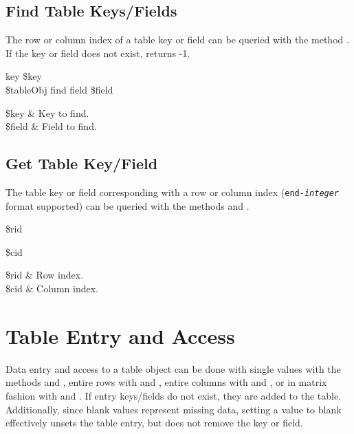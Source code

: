 \subsection{Find Table Keys/Fields}
The row or column index of a table key or field can be queried with the method . \\
If the key or field does not exist, returns -1.

\begin{syntax}
 key \$key \\
\$tableObj find field \$field
\end{syntax}
\begin{args}
\$key & Key to find. \\
\$field & Field to find.
\end{args}

\subsection{Get Table Key/Field}
The table key or field corresponding with a row or column index (\texttt{end-\textit{integer}} format supported) can be queried with the methods  and . 
\begin{syntax}
 \$rid
\end{syntax}
\begin{syntax}
 \$cid
\end{syntax}
\begin{args}
\$rid & Row index. \\
\$cid & Column index.
\end{args}
\clearpage

\section{Table Entry and Access}
Data entry and access to a table object can be done with single values with the methods  and , entire rows with  and , entire columns with  and , or in matrix fashion with  and  . 
If entry keys/fields do not exist, they are added to the table. 
Additionally, since blank values represent missing data, setting a value to blank effectively unsets the table entry, but does not remove the key or field. 
